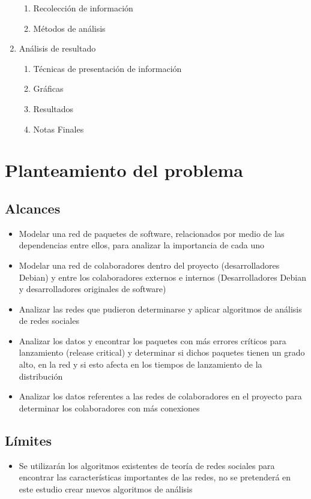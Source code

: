 \documentclass[12pt,titlepage]{report}
\begin{document}
\begin{enumerate}
\begin{enumerate}
  \item Recolección de información
  \item Métodos de análisis
  \end{enumerate}
\item Análisis de resultado
  \begin{enumerate}
  \item Técnicas de presentación de información
  \item Gráficas
  \item Resultados
  \item Notas Finales
  \end{enumerate}
\end{enumerate}

\chapter{Planteamiento del problema}
\section*{Alcances}
\begin{itemize}
\item Modelar una red de paquetes de software, relacionados por medio de las dependencias entre ellos, para analizar la importancia de cada uno
\item Modelar una red de colaboradores dentro del proyecto
  (desarrolladores Debian) y entre los colaboradores externos e
  internos (Desarrolladores Debian y desarrolladores originales de
  software)
\item Analizar las redes que pudieron determinarse y aplicar
  algoritmos de análisis de redes sociales
\item Analizar los datos y encontrar los paquetes con más errores
  críticos para lanzamiento (release critical) y determinar si dichos
  paquetes tienen un grado alto, en la red y si esto afecta en los
  tiempos de lanzamiento de la distribución
\item Analizar los datos referentes a las redes de colaboradores en el
  proyecto para determinar los colaboradores con más conexiones
\end{itemize}
\section*{Límites}
\begin{itemize}
\item Se utilizarán los algoritmos existentes de teoría de redes
  sociales para encontrar las características importantes de las
  redes, no se pretenderá en este estudio crear nuevos algoritmos de
  análisis
\end{itemize}
\end{document}
